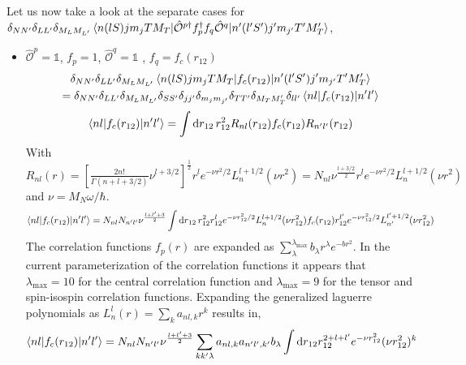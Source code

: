 \documentclass[10pt]{article}
\begin{document}
Let us now take a look at the separate cases for $\delta_{NN'} \delta_{LL'} 
\delta_{M_L M_{L'}} \braket{ n (l S) j m_j T M_T |  
\hat{\mathcal{O}}^{p\dagger} f^{\dagger}_{p} f_{q} \hat{\mathcal{O}}^{q} | n' 
(l' S') j' m_{j'} T' M_T'} $,
\begin{itemize}
	\item $\hat{\mathcal{O}}^{p} = \mathbb{1}$, $f_{p} = 1$, 
$\hat{\mathcal{O}}^{q} = \mathbb{1}$ , $f_{q} = f_c(r_{12})$ 
	\begin{multline*}
		\delta_{NN'} \delta_{LL'} \delta_{M_L M_{L'}} \braket{ n (l S) 
j m_j T M_T |  f_{c}(r_{12}) | n' (l' S') j' m_{j'} T' M_T'}  \\
		= \delta_{NN'} \delta_{LL'} \delta_{M_L M_{L'}} \delta_{SS'} 
\delta_{jj'} \delta_{m_j m_{j'}} \delta_{TT'} \delta_{M_T M_T'} \delta_{l l'} 
\braket{ n l |  f_{c}(r_{12}) | n' l'} 
	\end{multline*}
	\begin{multline*}
		\braket{ n l |  f_{c}(r_{12}) | n' l'} = \int \text{d} r_{12} 
\, r_{12}^{2} R_{nl}(r_{12}) f_{c}(r_{12}) R_{n'l'}(r_{12}) \\
	\end{multline*}
	With  $R_{nl}(r) = \left[ \frac{2n!}{\Gamma(n + l + 3/2)} \nu^{l + 3/2} 
\right]^{\frac{1}{2}} r^{l} e^{-\nu r^{2} /2} L_{n}^{l+1/2}(\nu r^{2}) = N_{nl} 
\nu^{\frac{l + 3/2}{2}} r^{l} e^{-\nu r^{2} /2} L_{n}^{l+1/2}(\nu r^{2})$ and $ 
\nu = M_N \omega / \hbar $.
	\begin{multline*}
		\braket{ n l |  f_{c}(r_{12}) | n' l'} = N_{nl} N_{n'l'} 
\nu^{\frac{l + l' + 3}{2}} \int \text{d} r_{12} \, r_{12}^{2} r_{12}^{l} 
e^{-\nu r_{12}^{2} /2} L_{n}^{l+1/2}(\nu r_{12}^{2}) f_{c}(r_{12}) r_{12}^{l'} 
e^{-\nu r_{12}^{2} /2} L_{n'}^{l'+1/2}(\nu r_{12}^{2}) \\
	\end{multline*}
	The correlation functions $f_{p}(r)$ are expanded as $ 
\sum_{\lambda}^{\lambda_{\text{max}}} b_{\lambda} r^{\lambda} e^{-b r^{2}}$.
	In the current parameterization of the correlation functions it appears 
that $\lambda_{\text{max}} = 10$ for the central correlation function and 
$\lambda_{\text{max}}=9$ for the tensor and spin-isospin correlation functions.
	Expanding the generalized laguerre polynomials as $ L_{n}^{l}(r) = 
\sum_{k} a_{nl,k} r^{k}$ results in,
	\begin{multline*}
		\braket{ n l |  f_{c}(r_{12}) | n' l'} = N_{nl} N_{n'l'} 
\nu^{\frac{l + l' + 3}{2}} \sum_{kk'\lambda} a_{nl,k} a_{n'l',k'} b_{\lambda}  
\int \text{d} r_{12} r_{12}^{2+l+l'} e^{-\nu r_{12}^{2}} ( \nu r_{12}^{2} )^{k} 

\end{multline*}
\end{itemize}
\end{document}
